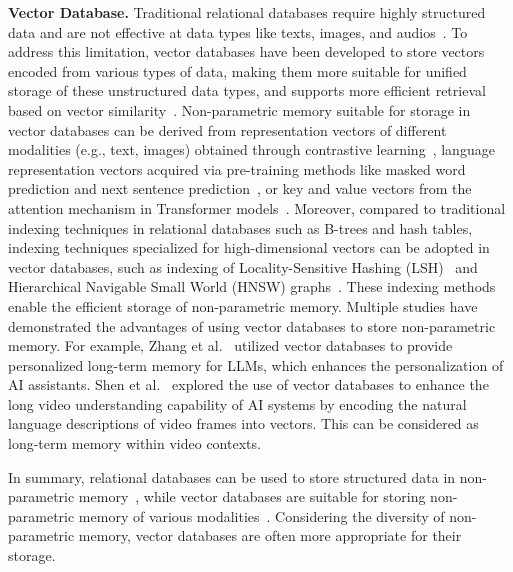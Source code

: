 \documentclass[journal,hideappendix]{vgtc}
\newenvironment{j_itemize}{
\begin{itemize}[]
  \setlength{\itemsep}{3pt}
  \setlength{\parskip}{0pt}
  \setlength{\parsep}{0pt}
}{\end{itemize}}
\begin{document}
\begin{j_itemize}
    \item[$\bullet$] \textbf{Vector Database.} Traditional relational databases require highly structured data and are not effective at data types like texts, images, and audios~\cite{jing2024large}. To address this limitation, vector databases have been developed to store vectors encoded from various types of data, making them more suitable for unified storage of these unstructured data types, and supports more efficient retrieval based on vector similarity~\cite{pan2023survey,han2023comprehensive}. Non-parametric memory suitable for storage in vector databases can be derived from representation vectors of different modalities (e.g., text, images) obtained through contrastive learning~\cite{clip2021radford,yusong2023audio,girdhar2023imagebind}, language representation vectors acquired via pre-training methods like masked word prediction and next sentence prediction~\cite{kenton2019bert,lan2019albert,liu2019roberta}, or key and value vectors from the attention mechanism in Transformer models~\cite{sukhbaatar2019augmenting,qiu2024empirical,wang2024augmenting,munkhdalai2024leave}. Moreover, compared to traditional indexing techniques in relational databases such as B-trees and hash tables, indexing techniques specialized for high-dimensional vectors can be adopted in vector databases, such as indexing of Locality-Sensitive Hashing (LSH)~\cite{datar2004locality} and Hierarchical Navigable Small World (HNSW) graphs~\cite{malkov2018efficient}. These indexing methods enable the efficient storage of non-parametric memory. Multiple studies have demonstrated the advantages of using vector databases to store non-parametric memory. For example, Zhang et al.~\cite{zhang2023long} utilized vector databases to provide personalized long-term memory for LLMs, which enhances the personalization of AI assistants. Shen et al.~\cite{shen2023encode} explored the use of vector databases to enhance the long video understanding capability of AI systems by encoding the natural language descriptions of video frames into vectors. 
    This can be considered as long-term memory within video contexts.
    
\end{j_itemize}

In summary, relational databases can be used to store structured data in non-parametric memory~\cite{codd1970relational,codd2007relational,luo2023chatkbqa,hu2023chatdb}, while vector databases are suitable for storing non-parametric memory of various modalities~\cite{pan2023survey,zhang2023long}. Considering the diversity of non-parametric memory, vector databases are often more appropriate for their storage.
\end{document}
